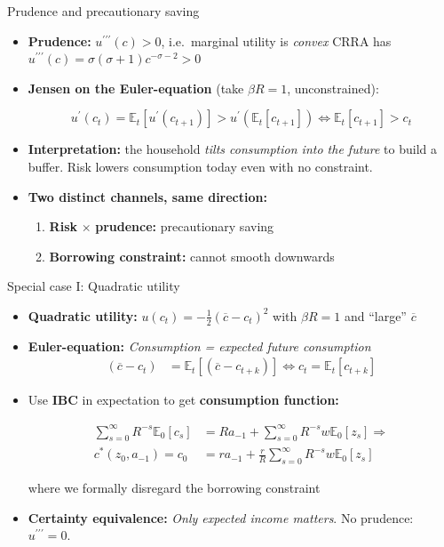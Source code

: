 \documentclass[
  10pt,
  ignorenonframetext,
  aspectratio=43,
  english,
  handout]{beamer}
\providecommand{\tightlist}{%
  \setlength{\itemsep}{0pt}\setlength{\parskip}{0pt}}
\begin{document}
\begin{frame}{Prudence and precautionary saving}
\protect{}\label{prudence-and-precautionary-saving}
\begin{itemize}
\item
  \textbf{Prudence:} \(u^{\prime\prime\prime}(c)>0\), i.e.~marginal
  utility is \emph{convex} CRRA has
  \(u^{\prime\prime\prime}(c)=\sigma(\sigma+1)c^{-\sigma-2}>0\)
\item
  \textbf{Jensen on the Euler-equation} (take \(\beta R=1\),
  unconstrained):

  \[
    u^{\prime}(c_{t})=\mathbb{E}_{t}\left[u^{\prime}(c_{t+1})\right]>u^{\prime}\left(\mathbb{E}_{t}\left[c_{t+1}\right]\right)\Leftrightarrow\mathbb{E}_{t}\left[c_{t+1}\right]>c_{t}
    \]
\item
  \textbf{Interpretation:} the household \emph{tilts consumption into
  the future} to build a buffer. Risk lowers consumption today even with
  no constraint.
\item
  \textbf{Two distinct channels, same direction:}

  \begin{enumerate}
  \tightlist
  \item
    \textbf{Risk} \(\times\) \textbf{prudence:} precautionary saving
  \item
    \textbf{Borrowing constraint:} cannot smooth downwards
  \end{enumerate}
\end{itemize}
\end{frame}

\begin{frame}{Special case I: Quadratic utility}
\protect{}\label{special-case-i-quadratic-utility}
\begin{itemize}
\item
  \textbf{Quadratic utility:}
  \(u(c_{t})=-\frac{1}{2}(\overline{c}-c_{t})^{2}\) with \(\beta R=1\)
  and ``large'' \(\overline{c}\)
\item
  \textbf{Euler-equation:} \emph{Consumption = expected future
  consumption} \[
    \begin{aligned}
    (\overline{c}-c_{t}) & =\mathbb{E}_{t}\left[(\overline{c}-c_{t+k})\right]\Leftrightarrow c_{t}=\mathbb{E}_{t}\left[c_{t+k}\right]
    \end{aligned}
    \]
\item
  Use \textbf{IBC} in expectation to get \textbf{consumption function:}

  \[
    \begin{aligned}
    \sum_{s=0}^{\infty}R^{-s}\mathbb{E}_{0}\left[c_{s}\right] &=Ra_{-1}+\sum_{s=0}^{\infty}R^{-s}w\mathbb{E}_{0}\left[z_{s}\right]\Rightarrow\\
    c^{\ast}(z_{0},a_{-1})=c_{0} &=ra_{-1}+\frac{r}{R}\sum_{s=0}^{\infty}R^{-s}w\mathbb{E}_{0}\left[z_{s}\right]
    \end{aligned}
    \]

  where we formally disregard the borrowing constraint
\item
  \textbf{Certainty equivalence:} \emph{Only expected income matters}.
  No prudence: \(u^{\prime\prime\prime}=0\).
\end{itemize}
\end{frame}
\end{document}
